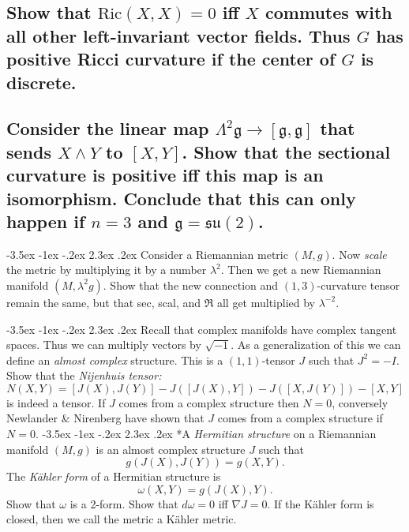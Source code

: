 \documentclass[10pt]{article}
\makeatletter
\renewcommand\section{\@startsection{section}{1}{\z@}%
                                  {-3.5ex \@plus -1ex \@minus -.2ex}%
                                  {2.3ex \@plus.2ex}%
                                  {\normalfont\large\bfseries}}
\newcommand{\ric}{\mbox{Ric}}
\makeatother
\begin{document}
\subsection{Show that $\ric(X,X) =0$ iff $X$ commutes with all other left-invariant vector fields. Thus $G$ has positive Ricci curvature if the center of $G$ is discrete.}
\subsection{Consider the linear map $\Lambda^2 \mathfrak{g} \to [\mathfrak{g} , \mathfrak{g}]$ that sends $X \wedge Y$ to $[X,Y]$. Show that the sectional curvature is positive iff this map is an isomorphism. Conclude that this can only happen if $n=3$ and $\mathfrak{g} = \mathfrak{su} (2)$.}


\section{Consider a Riemannian metric $(M,g)$. Now \emph{scale} the metric by multiplying it by a number $\lambda^2$. Then we get  a new Riemannian manifold $(M, \lambda^2 g)$. Show that the new connection and $(1,3)$-curvature tensor remain the same, but that sec, scal, and $\mathfrak{R}$ all get multiplied by $\lambda^{-2}$.}

\section{Recall that complex manifolds have complex tangent spaces. Thus we can multiply vectors by $\sqrt {-1}$. As a generalization of this we can define an \emph{almost complex} structure. This is a $(1,1)$-tensor $J$ such that $J^2 =-I$. Show that the \emph{Nijenhuis tensor:} $$N(X,Y) = [J(X), J(Y)] - J([J(X),Y])- J([X,J(Y)]) - [X,Y]$$ is indeed a tensor. If $J$ comes from a complex structure then $N=0$, conversely Newlander \& Nirenberg have shown that $J$ comes from a complex structure if $N=0$.}
\section*{A \emph{Hermitian  structure} on a Riemannian manifold $(M,g)$ is an almost complex structure $J$ such that $$g(J(X), J(Y)) = g(X,Y).$$ The \emph{K\"ahler form} of a Hermitian structure is $$\omega(X,Y) = g(J(X),Y).$$ Show that $\omega$ is a 2-form. Show that $d \omega =0$ iff $\nabla J=0$. If the K\"ahler form is closed, then we call the metric a K\"ahler metric.}
\end{document}
